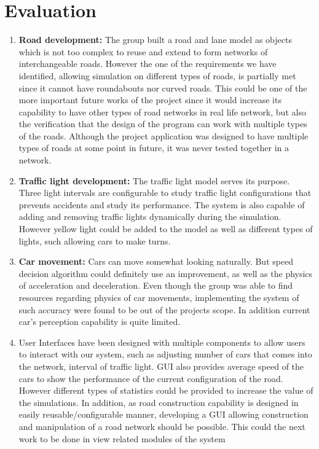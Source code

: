 \documentclass[11pt]{article}
\begin{document}
\section{Evaluation} %
\begin{enumerate}
	\item \textbf{Road development:} The group built a road and lane model as objects which is not too complex to reuse and extend to form networks of interchangeable roads. However the one of the requirements we have identified, allowing simulation on different types of roads, is partially met since it cannot have roundabouts nor curved roads. This could be one of the more important future works of the project since it would increase its capability to have other types of  road networks in real life network, but also the verification that the design of the program can work with multiple types of the roads. Although the project application was designed to have multiple types of roads at some point in future, it was never tested together in a network.
	
	\item \textbf{Traffic light development:} The traffic light model serves its purpose. Three light intervals are configurable to study traffic light configurations that prevents accidents and study its performance. The system is also capable of adding and removing traffic lights dynamically during the simulation. However yellow light could be added to the model as well as different types of lights, such allowing cars to make turns.
	
	\item \textbf{Car movement:} Cars can move somewhat looking naturally. But speed decision algorithm could definitely use an improvement, as well as the physics of acceleration and deceleration. Even though the group was able to find resources regarding physics of car movements, implementing the system of such accuracy were found to be out of the projects scope. In addition current car's perception capability is quite limited.
	
	\item User Interfaces have been designed with multiple components to allow users to interact with our system, such as adjusting number of cars that comes into the network, interval of traffic light. GUI also provides average speed of the cars to show the performance of the current configuration of the road. However different types of statistics could be provided to increase the value of the simulations. In addition, as road construction capability is designed in easily reusable/configurable manner, developing a GUI allowing construction and manipulation of a road network should be possible. This could the next work to be done in view related modules of the system
	

\end{enumerate}
\end{document}
